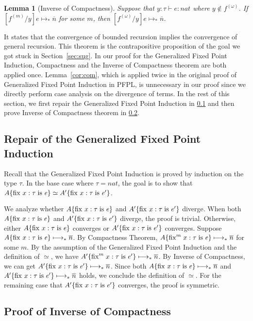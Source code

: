\documentclass{article}
\newtheorem{lemma}{Lemma}
\begin{document}
\begin{lemma}[Inverse of Compactness] \label{lem:cc}
  Suppose that $y:\tau\vdash e:\textit{nat}$ where $y\notin f^{(\omega)}$.
  If $[f^{(m)}/y]e\longmapsto_*\overline{n}$ for some $m$, then $[f^{(\omega)}/y]e\longmapsto_*\overline{n}$.
\end{lemma}

It states that the convergence of bounded recursion implies the convergence of general recursion.
This theorem is the contrapositive proposition of the goal we got stuck in Section~\ref{sec:sug}.
In our proof for the Generalized Fixed Point Induction,
Compactness and the Inverse of Compactness theorem are both applied once.
Lemma~\ref{cor:com}, which is applied twice in the original proof of Generalized Fixed Point Induction in PFPL,
is unnecessary in our proof since we directly perform case analysis on the divergence of terms.
In the rest of this section, we first repair the Generalized Fixed Point Induction in \ref{subsec:repair}
and then prove Inverse of Compactness theorem in \ref{subsec:inverse}.

\subsection{Repair of the Generalized Fixed Point Induction}
\label{subsec:repair}

Recall that the Generalized Fixed Point Induction is proved by
induction on the type $\tau$.
In the base case where $\tau=\textit{nat}$, the goal is to show that
$A\{\mathrm{fix}^{}\;x:\tau\;\mathrm{is}\;\mathit{e}\} \simeq A'\{\mathrm{fix}^{}\;x:\tau\;\mathrm{is}\;\mathit{e'}\}$.

We analyze whether $A\{\mathrm{fix}^{}\;x:\tau\;\mathrm{is}\;\mathit{e}\}$ and $A'\{\mathrm{fix}^{}\;x:\tau\;\mathrm{is}\;\mathit{e'}\}$ diverge.
When both $A\{\mathrm{fix}^{}\;x:\tau\;\mathrm{is}\;\mathit{e}\}$ and $A'\{\mathrm{fix}^{}\;x:\tau\;\mathrm{is}\;\mathit{e'}\}$ diverge, the proof is trivial.
Otherwise, either $A\{\mathrm{fix}^{}\;x:\tau\;\mathrm{is}\;\mathit{e}\}$ converges or $A'\{\mathrm{fix}^{}\;x:\tau\;\mathrm{is}\;\mathit{e'}\}$ converges.
Suppose $A\{\mathrm{fix}^{}\;x:\tau\;\mathrm{is}\;\mathit{e}\}\longmapsto_*\overline{n}$.
By Compactness Theorem, $A\{\mathrm{fix}^{m}\;x:\tau\;\mathrm{is}\;\mathit{e}\} \longmapsto_*\overline{n}$ for some $m$.
By the assumption of the Generalized Fixed Point Induction and the definition of $\simeq$, we have $A'\{\mathrm{fix}^{m}\;x:\tau\;\mathrm{is}\;\mathit{e'}\} \longmapsto_*\overline{n}$.
By Inverse of Compactness, we can get $A'\{\mathrm{fix}^{}\;x:\tau\;\mathrm{is}\;\mathit{e'}\} \longmapsto_*\overline{n}$.
Since both $A\{\mathrm{fix}^{}\;x:\tau\;\mathrm{is}\;\mathit{e}\} \longmapsto_*\overline{n}$ and $A'\{\mathrm{fix}^{}\;x:\tau\;\mathrm{is}\;\mathit{e'}\} \longmapsto_*\overline{n}$ holds, we conclude the definition of $\simeq$.
For the remaining case that $A'\{\mathrm{fix}^{}\;x:\tau\;\mathrm{is}\;\mathit{e'}\}$ converges, the proof is symmetric.

\subsection{Proof of Inverse of Compactness}
\label{subsec:inverse}
\end{document}
